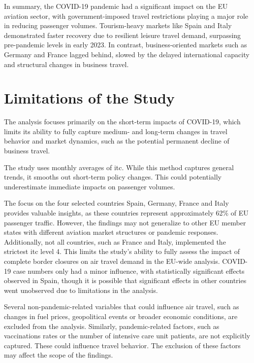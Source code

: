 \documentclass[12pt,onehalfspacing,headsepline,oneside,openright,a4paper, fleqn]{report}
\begin{document}
In summary, the COVID-19 pandemic had a significant impact on the EU aviation sector, with government-imposed travel restrictions playing a major role in reducing passenger volumes. Tourism-heavy markets like Spain and Italy demonstrated faster recovery due to resilient leisure travel demand, surpassing pre-pandemic levels in early 2023. In contrast, business-oriented markets such as Germany and France lagged behind, slowed by the delayed international capacity and structural changes in business travel.

\section{Limitations of the Study}

The analysis focuses primarily on the short-term impacts of COVID-19, which limits its ability to fully capture medium- and long-term changes in travel behavior and market dynamics, such as the potential permanent decline of business travel.

The study uses monthly averages of \gls{itc}. While this method captures general trends, it smooths out short-term policy changes. This could potentially underestimate immediate impacts on passenger volumes.

The focus on the four selected countries Spain, Germany, France and Italy provides valuable insights, as these countries represent approximately 62\% of EU passenger traffic. However, the findings may not generalize to other EU member states with different aviation market structures or pandemic responses. Additionally, not all countries, such as France and Italy, implemented the strictest \gls{itc} level 4. This limits the study's ability to fully assess the impact of complete border closures on air travel demand in the EU-wide analysis. COVID-19 case numbers only had a minor influence, with statistically significant effects observed in Spain, though it is possible that significant effects in other countries went unobserved due to limitations in the analysis.

Several non-pandemic-related variables that could influence air travel, such as changes in fuel prices, geopolitical events or broader economic conditions, are excluded from the analysis. Similarly, pandemic-related factors, such as vaccinations rates or the number of intensive care unit patients, are not explicitly captured. These could influence travel behavior. The exclusion of these factors may affect the scope of the findings. 
\end{document}

